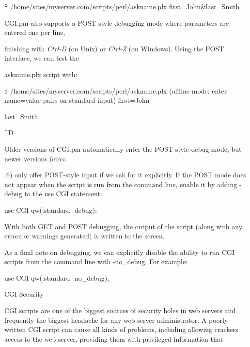 \documentclass[a4paper,11pt]{book}
\begin{document}
\noindent 

\noindent \$ /home/sites/myserver.com/scripts/perl/askname.plx first=John\&last=Smith

\noindent 

\noindent 

\noindent CGI.pm also supports a POST-style debugging mode where parameters are entered one per line,

\noindent finishing with \textit{Ctrl-D }(on Unix) or \textit{Ctrl-Z }(on Windows). Using the POST interface, we can test the

\noindent askname.plx script with:

\noindent 

\noindent \$ /home/sites/myserver.com/scripts/perl/askname.plx (offline mode: enter name=value pairs on standard input) first=John

\noindent last=Smith

\noindent \^{}D

\noindent 

\noindent Older versions of CGI.pm automatically enter the POST-style debug mode, but newer versions (circa

.6) only offer POST-style input if we ask for it explicitly. If the POST mode does not appear when the script is run from the command line, enable it by adding -debug to the use CGI statement:

\noindent 

\noindent use CGI qw(:standard -debug);

\noindent 

\noindent With both GET and POST debugging, the output of the script (along with any errors or warnings generated) is written to the screen.

\noindent 

\noindent As a final note on debugging, we can explicitly disable the ability to run CGI scripts from the command line with -no\_debug. For example:

\noindent 

\noindent use CGI qw(:standard -no\_debug);

\noindent 

\noindent 

\noindent CGI Security

\noindent 

\noindent CGI scripts are one of the biggest sources of security holes in web servers and frequently the biggest headache for any web server administrator. A poorly written CGI script can cause all kinds of problems, including allowing crackers access to the web server, providing them with privileged information that
\end{document}
